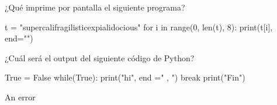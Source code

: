 \begin{ejercicio} ¿Qué imprime por pantalla el siguiente programa?

\begin{python}
t = "supercalifragilisticexpialidocious"
for i in range(0, len(t), 8):
	print(t[i], end="")
\end{python}

\begin{choices}
    \choice {}   %
    \choice {}
    \choice {}
    \choice {}
\end{choices}

\end{ejercicio}

\begin{ejercicio} ¿Cuál será el output del siguiente código de Python?

\begin{python}
True = False
while(True):
    print("hi", end =" , ")
    break
print("Fin")
\end{python}

\begin{choices}
    \choice An error   %
    \choice  {}
    \choice  {}
    \choice  {}
\end{choices}

\end{ejercicio}

